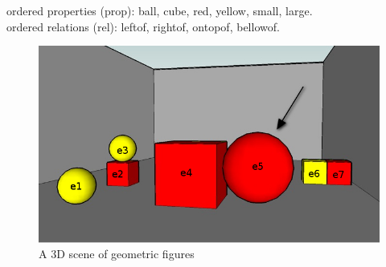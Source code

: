 ordered properties (prop): \textsf{ball}, \textsf{cube}, \textsf{red}, \textsf{yellow}, \textsf{small}, \textsf{large}.\\
ordered relations (rel): \textsf{leftof}, \textsf{rightof}, \textsf{ontopof}, \textsf{bellowof}.

\begin{figure}
\begin{center}	
\includegraphics[width=.5\textwidth]{images/22.jpg}
\end{center}
\vspace*{-1.5em}
\caption{A 3D scene of geometric figures}\label{figure22}
\end{figure}

